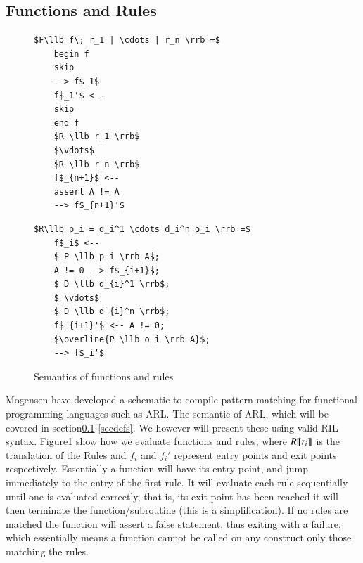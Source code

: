 \documentclass[a4paper]{article}
\begin{document}
\subsection{Functions and Rules}
\label{secrules}
\begin{figure}[!htb]
\begin{minipage}{0.4\textwidth}
\begin{lstlisting}
$F\llb f\; r_1 | \cdots | r_n \rrb =$
    begin f
    skip
    --> f$_1$
    f$_1'$ <--
    skip
    end f
    $R \llb r_1 \rrb$
    $\vdots$
    $R \llb r_n \rrb$
    f$_{n+1}$ <--
    assert A != A
    --> f$_{n+1}'$
\end{lstlisting}
\end{minipage}
\qquad
\begin{minipage}{0.4\textwidth}
\begin{lstlisting}
$R\llb p_i = d_i^1 \cdots d_i^n o_i \rrb =$
    f$_i$ <--
    $ P \llb p_i \rrb A$;
    A != 0 --> f$_{i+1}$;
    $ D \llb d_{i}^1 \rrb$;
    $ \vdots$
    $ D \llb d_{i}^n \rrb$;
    f$_{i+1}'$ <-- A != 0;
    $\overline{P \llb o_i \rrb A}$;
    --> f$_i'$
\end{lstlisting}
\end{minipage}
\caption{Semantics of functions and rules}
\label{rules}
\end{figure}

Mogensen have developed a schematic to compile pattern-matching for functional programming languages such as ARL\cite{patterns}. The semantic of ARL, which will be covered in section\ref{secrules}-\ref{secdefs}. We however will present these using valid RIL syntax. Figure\ref{rules} show how we evaluate functions and rules, where \(R \llbracket r_i \rrbracket\) is the translation of the Rules and \(f_i\) and  \(f_i'\) represent entry points and exit points respectively. Essentially a function will have its entry point, and jump immediately to the entry of the first rule. It will evaluate each rule sequentially until one is evaluated correctly, that is, its exit point has been reached it will then terminate the function/subroutine (this is a simplification). If no rules are matched the function will assert a false statement, thus exiting with a failure, which essentially means a function cannot be called on any construct only those matching the rules.
\end{document}
